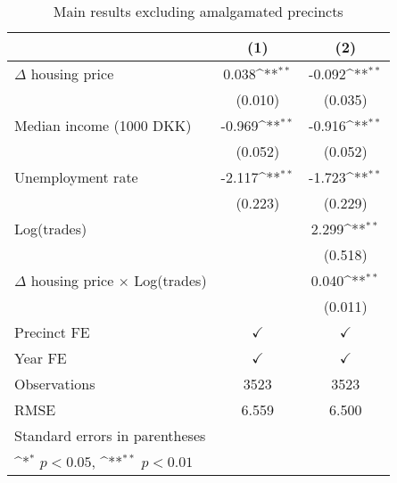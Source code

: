 \begin{table}[htbp]\centering
\def\sym#1{\ifmmode^{#1}\else\(^{#1}\)\fi}
\caption{Main results excluding amalgamated precincts} \footnotesize \label{calculated}
\begin{tabular}{l*{2}{c}}
\hline\hline
                    &\multicolumn{1}{c}{(1)}        &\multicolumn{1}{c}{(2)}        \\
\hline
$\Delta$ housing price&       0.038\sym{**}&      -0.092\sym{**}\\
                    &     (0.010)        &     (0.035)        \\
[1em]
Median income (1000 DKK)&      -0.969\sym{**}&      -0.916\sym{**}\\
                    &     (0.052)        &     (0.052)        \\
[1em]
Unemployment rate   &      -2.117\sym{**}&      -1.723\sym{**}\\
                    &     (0.223)        &     (0.229)        \\
[1em]
Log(trades)         &                    &       2.299\sym{**}\\
                    &                    &     (0.518)        \\
[1em]
$\Delta$ housing price $\times$ Log(trades)&                    &       0.040\sym{**}\\
                    &                    &     (0.011)        \\
[1em]
\hline Precinct FE  &$\checkmark$        &$\checkmark$        \\
[1em]
Year FE             &$\checkmark$        &$\checkmark$        \\
\hline
Observations        &        3523        &        3523        \\
RMSE                &       6.559        &       6.500        \\
\hline\hline
\multicolumn{3}{l}{\footnotesize Standard errors in parentheses}\\
\multicolumn{3}{l}{\footnotesize \sym{*} \(p<0.05\), \sym{**} \(p<0.01\)}\\
\end{tabular}
\end{table}
